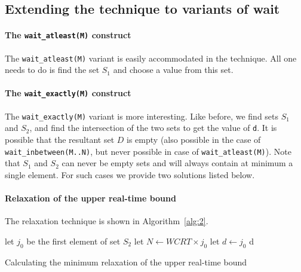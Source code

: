 \subsection{Extending the technique to variants of wait}
\label{sec:extend-tehcn-vari}

\paragraph{The \texttt{wait\_atleast(M)} construct}
\label{sec:extend-techn-vari}

The \texttt{wait\_atleast(M)} variant is easily accommodated in the
technique. All one needs to do is find the set $S_1$ and choose a value
from this set.

\paragraph{The \texttt{wait\_exactly(M)} construct}
\label{sec:extend-techn-vari}

The \texttt{wait\_exactly(M)} variant is more interesting. Like before,
we find sets $S_1$ and $S_2$, and find the intersection of the two sets
to get the value of \texttt{d}. It is possible %
that the resultant set $D$ is empty (also possible in the case of
\texttt{wait\_inbetween(M..N)}, but never possible in case of
\texttt{wait\_atleast(M)}). Note that $S_1$ and $S_2$ can never be empty
sets and will always contain at minimum a single element. For such cases
we provide two solutions listed below.


\paragraph{Relaxation of the upper real-time bound}
\label{sec:over-appr-relax}

The relaxation technique is shown in Algorithm~\ref{alg:2}.
  
\begin{algorithm}[t!]
  \begin{minipage}{1.0\linewidth}
    \SetAlgoLined
     {
      let $j_{0}$ be the first element of set $S_2$\;
      \ShowLn let $N \leftarrow WCRT \times j_0$\;
      let $d \leftarrow j_0$\;
    }
    \Return d\;
    \caption{Calculating the minimum relaxation of the upper real-time
      bound}
    \label{alg:2}
  \end{minipage}
\end{algorithm}


